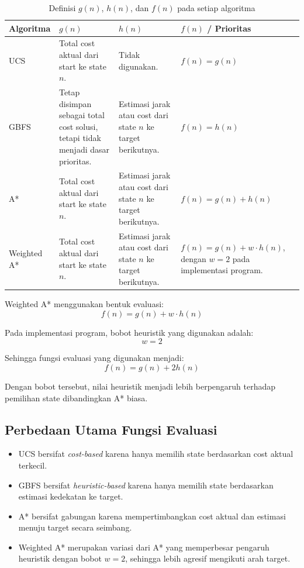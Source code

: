 \begin{table}[H]
	\centering
	\caption{Definisi $g(n)$, $h(n)$, dan $f(n)$ pada setiap algoritma}
	\small
	\begin{tabular}{|p{2.5cm}|p{3.3cm}|p{3.3cm}|p{4cm}|}
		\hline
		\rowcolor{gray!25}
		\textbf{Algoritma} & \textbf{$g(n)$} & \textbf{$h(n)$} & \textbf{$f(n)$ / Prioritas} \\
		\hline
		UCS & Total cost aktual dari start ke state $n$. & Tidak digunakan. & $f(n)=g(n)$ \\
		\hline
		GBFS & Tetap disimpan sebagai total cost solusi, tetapi tidak menjadi dasar prioritas. & Estimasi jarak atau cost dari state $n$ ke target berikutnya. & $f(n)=h(n)$ \\
		\hline
		A* & Total cost aktual dari start ke state $n$. & Estimasi jarak atau cost dari state $n$ ke target berikutnya. & $f(n)=g(n)+h(n)$ \\
		\hline
		Weighted A* & Total cost aktual dari start ke state $n$. & Estimasi jarak atau cost dari state $n$ ke target berikutnya. & $f(n)=g(n)+w \cdot h(n)$, dengan $w=2$ pada implementasi program. \\
		\hline
	\end{tabular}
\end{table}

\begin{tcolorbox}[
	colback=purple!5,
	colframe=purple!60!black,
	title=\textbf{Fungsi Evaluasi Weighted A*},
	arc=2mm,
	boxrule=0.8pt
]
Weighted A* menggunakan bentuk evaluasi:
\[
	f(n)=g(n)+w \cdot h(n)
\]

Pada implementasi program, bobot heuristik yang digunakan adalah:
\[
	w = 2
\]

Sehingga fungsi evaluasi yang digunakan menjadi:
\[
	f(n)=g(n)+2h(n)
\]

Dengan bobot tersebut, nilai heuristik menjadi lebih berpengaruh terhadap pemilihan state dibandingkan A* biasa.
\end{tcolorbox}

\subsection{Perbedaan Utama Fungsi Evaluasi}

\begin{tcolorbox}[
	colback=gray!5,
	colframe=black!60,
	title=\textbf{Perbedaan Utama Fungsi Evaluasi},
	arc=2mm,
	boxrule=0.8pt
]
\begin{itemize}
	\item UCS bersifat \textit{cost-based} karena hanya memilih state berdasarkan cost aktual terkecil.
	\item GBFS bersifat \textit{heuristic-based} karena hanya memilih state berdasarkan estimasi kedekatan ke target.
	\item A* bersifat gabungan karena mempertimbangkan cost aktual dan estimasi menuju target secara seimbang.
	\item Weighted A* merupakan variasi dari A* yang memperbesar pengaruh heuristik dengan bobot $w=2$, sehingga lebih agresif mengikuti arah target.
\end{itemize}
\end{tcolorbox}

